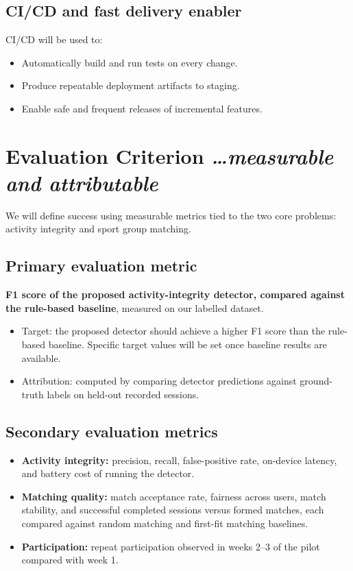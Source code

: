 \documentclass[11pt,a4paper]{article}
\newcommand{\BvrHint}[1]{%
  {\normalfont\normalsize\itshape\hfill #1}}
\begin{document}
\subsection{CI/CD and fast delivery enabler}
CI/CD will be used to:
\begin{itemize}[leftmargin=0.7cm]
    \item Automatically build and run tests on every change.
    \item Produce repeatable deployment artifacts to staging.
    \item Enable safe and frequent releases of incremental features.
\end{itemize}

\section{Evaluation Criterion %
\BvrHint{\ldots measurable and attributable}}
We will define success using measurable metrics tied to the two core
problems: activity integrity and sport group matching.

\subsection{Primary evaluation metric}
\textbf{F1 score of the proposed activity-integrity detector, compared
against the rule-based baseline}, measured on our labelled dataset.
\begin{itemize}[leftmargin=0.7cm]
    \item Target: the proposed detector should achieve a higher F1 score than the rule-based baseline. Specific target values will be set once baseline results are available.
    \item Attribution: computed by comparing detector predictions against ground-truth labels on held-out recorded sessions.
\end{itemize}

\subsection{Secondary evaluation metrics}
\begin{itemize}[leftmargin=0.7cm]
    \item \textbf{Activity integrity:} precision, recall, false-positive rate, on-device latency, and battery cost of running the detector.
    \item \textbf{Matching quality:} match acceptance rate, fairness across users, match stability, and successful completed sessions versus formed matches, each compared against random matching and first-fit matching baselines.
    \item \textbf{Participation:} repeat participation observed in weeks 2--3 of the pilot compared with week 1.
\end{itemize}
\end{document}
